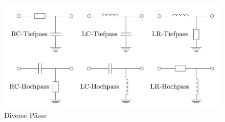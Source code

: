 		\begin{figure}[h]
		\includegraphics[width=\textwidth]{images/TP-HP-USW.png}
		\caption{Diverse Pässe}
		\end{figure}

